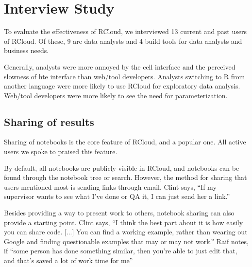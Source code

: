 \section{Interview Study\label{sec:interviews}}

To evaluate the effectiveness of RCloud, we interviewed 13 current and past
users of RCloud. Of these, 9 are data analysts and 4 build tools for data
analysts and business needs.

Generally, analysts were more annoyed by the cell interface and the
perceived slowness of hte interface than web/tool developers. Analysts
switching to R from another language were more likely to use RCloud for
exploratory data analysis. Web/tool developers were more likely to see the
need for parameterization.


\subsection{Sharing of results}
Sharing of notebooks is the core feature of RCloud, and a popular one. All
active users we spoke to praised this feature.


By default, all notebooks are publicly visible in RCloud, and notebooks can be
found through the notebook tree or search. However, the method for sharing that
users mentioned most is sending links through email. Clint says, ``If my supervisor
wants to see what I've done or QA it, I can just send her a link.''

Besides providing a way to present work to others, notebook sharing can also
provide a starting point. Clint says, ``I think the best part about it is how
easily you can share code. [...] You can find a working example, rather than wearing
out Google and finding questionable examples that may or may not work.'' Raif
notes, if ``some person has done something similar, then you're able to just
edit that, and that's saved a lot of work time for me''

